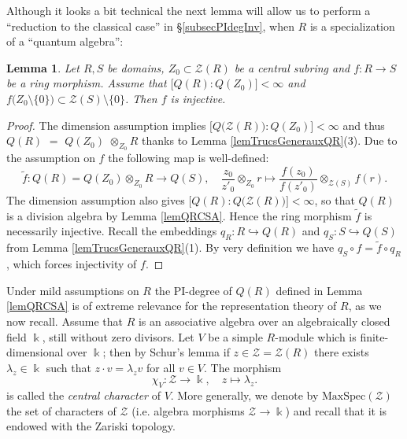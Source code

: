 \documentclass[11pt]{amsart}
\newtheorem{lem}[teo]{Lemma}
\begin{document}
Although it looks a bit technical the next lemma will allow us to perform a ``reduction to the classical case'' in \S\ref{subsecPIdegInv}, when $R$ is a specialization of a ``quantum algebra'':
\begin{lem}\label{lemmeTechniqueInjectivite}
Let $R, S$ be domains, $Z_0 \subset \mathcal{Z}(R)$ be a central subring and $f : R \to S$ be a ring morphism. Assume that $\bigl[ Q(R) : Q(Z_0) \bigl] < \infty$ and $f\bigl( Z_0 \setminus \{0\} \bigr) \subset \mathcal{Z}(S) \setminus \{ 0 \}$. Then $f$ is injective.
\end{lem}
\begin{proof}
The dimension assumption implies $\bigl[ Q\bigl( \mathcal{Z}(R) \bigr) : Q(Z_0) \bigl] < \infty$ and thus $Q(R)$ $=$ $Q(Z_0)$ $\otimes_{Z_0} R$ thanks to Lemma \ref{lemTrucsGenerauxQR}(3). Due to the assumption on $f$ the following map is well-defined:
\[ \widetilde{f} : Q(R) = Q(Z_0) \otimes_{Z_0} R \to Q(S), \quad  \frac{z_0}{z'_0} \otimes_{Z_0} r \mapsto \frac{f(z_0)}{f(z'_0)} \otimes_{\mathcal{Z}(S)} f(r). \]
The dimension assumption also gives $\bigl[ Q(R) : Q\bigl( \mathcal{Z}(R) \bigr) \bigr] < \infty$, so that $Q(R)$ is a division algebra by Lemma \ref{lemQRCSA}. Hence the ring morphism $\widetilde{f}$ is necessarily injective. Recall the embeddings $q_R : R \hookrightarrow Q(R)$ and $q_S : S \hookrightarrow Q(S)$ from Lemma \ref{lemTrucsGenerauxQR}(1). By very definition we have $q_S \circ f = \widetilde{f} \circ q_R$, which forces injectivity of $f$.
\end{proof}


\indent Under mild assumptions on $R$ the PI-degree of $Q(R)$ defined in Lemma \ref{lemQRCSA} is of extreme relevance for the representation theory of $R$, as we now recall. Assume that $R$ is an associative algebra over an algebraically closed field $\Bbbk$, still without zero divisors. Let $V$ be a simple $R$-module which is finite-dimensional over $\Bbbk$; then by Schur's lemma if $z \in \mathcal{Z} = \mathcal{Z}(R)$ there exists $\lambda_z \in \Bbbk$ such that $z \cdot v = \lambda_z v$ for all $v \in V$. The morphism
\[ \chi_V : \mathcal{Z} \to \Bbbk, \quad z \mapsto \lambda_z. \]
is called the {\em central character} of $V$. More generally, we denote by $\mathrm{MaxSpec}(\mathcal{Z})$ the set of characters of $\mathcal{Z}$ (i.e. algebra morphisms $\mathcal{Z} \to \Bbbk$) and recall that it is endowed with the Zariski topology.
\end{document}
